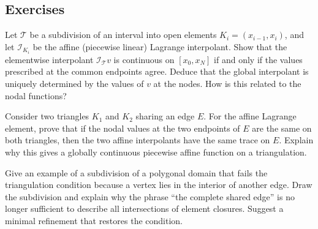 \subsection*{Exercises}
\begin{exercises}
    \ex Let $\mathcal T$ be a subdivision of an interval into open elements
    $K_i=(x_{i-1},x_i)$, and let $\mathcal I_{K_i}$ be the affine (piecewise
    linear) Lagrange interpolant. Show that the elementwise interpolant
    $\mathcal I_{\mathcal T}v$ is continuous on $[x_0,x_N]$ if and only if the
    values prescribed at the common endpoints agree. Deduce that the global
    interpolant is uniquely determined by the values of $v$ at the nodes.
    How is this related to the nodal functions?

    \ex Consider two triangles $K_1$ and $K_2$ sharing an edge $E$. For the
    affine Lagrange element, prove that if the nodal values at the two
    endpoints of $E$ are the same on both triangles, then the two affine
    interpolants have the same trace on $E$. Explain why this gives a globally
    continuous piecewise affine function on a triangulation.

    \ex Give an example of a subdivision of a polygonal domain that fails the
    triangulation condition because a vertex lies in the interior of another
    edge. Draw the subdivision and explain why the phrase ``the complete shared
    edge'' is no longer sufficient to describe all intersections of element
    closures. Suggest a minimal refinement that restores the condition.

\end{exercises}
